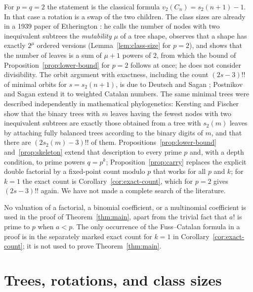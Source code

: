 \documentclass[11pt]{amsart}
\theoremstyle{definition}
\theoremstyle{remark}
\begin{document}
For $p=q=2$ the statement is the classical formula $v_2(C_n)=s_2(n+1)-1$.  In that case a rotation is a swap of the two children.  The class sizes are already in a 1939 paper of Etherington \cite{Etherington}: he calls the number of nodes with two inequivalent subtrees the \emph{mutability} $\mu$ of a tree shape, observes that a shape has exactly $2^{\mu}$ ordered versions (Lemma~\ref{lem:class-size} for $p=2$), and shows that the number of leaves is a sum of $\mu+1$ powers of $2$, from which the bound of Proposition~\ref{prop:lower-bound} for $p=2$ follows at once; he does not consider divisibility.  The orbit argument with exactness, including the count $(2s-3)!!$ of minimal orbits for $s=s_2(n+1)$, is due to Deutsch and Sagan \cite{DeutschSagan}; Postnikov and Sagan \cite{PostnikovSagan} extend it to weighted Catalan numbers.  The same minimal trees were described independently in mathematical phylogenetics: Kersting and Fischer \cite{KerstingFischer} show that the binary trees with $m$ leaves having the fewest nodes with two inequivalent subtrees are exactly those obtained from a tree with $s_2(m)$ leaves by attaching fully balanced trees according to the binary digits of $m$, and that there are $(2s_2(m)-3)!!$ of them.  Propositions~\ref{prop:lower-bound} and~\ref{prop:skeleton} extend that description to every prime $p$ and, with a depth condition, to prime powers $q=p^k$; Proposition~\ref{prop:carry} replaces the explicit double factorial by a fixed-point count modulo $p$ that works for all $p$ and $k$; for $k=1$ the exact count is Corollary~\ref{cor:exact-count}, which for $p=2$ gives $(2s-3)!!$ again.  We have not made a complete search of the literature.

No valuation of a factorial, a binomial coefficient, or a multinomial coefficient is used in the proof of Theorem~\ref{thm:main}, apart from the trivial fact that $a!$ is prime to $p$ when $a<p$.  The only occurrence of the Fuss--Catalan formula in a proof is in the separately marked exact count for $k=1$ in Corollary~\ref{cor:exact-count}; it is not used to prove Theorem~\ref{thm:main}.

\section{Trees, rotations, and class sizes}
\end{document}
